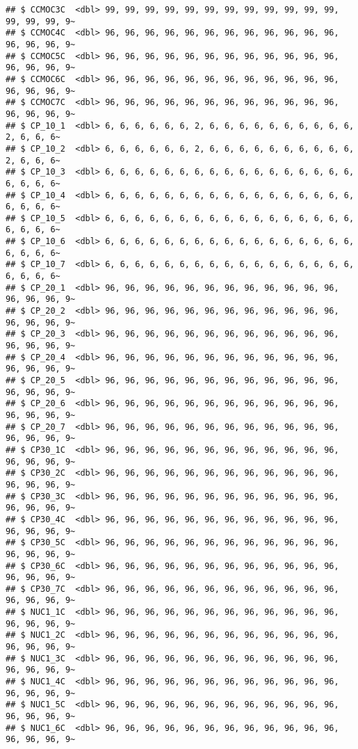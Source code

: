 \documentclass[
]{article}
\begin{document}
\begin{verbatim}
## $ CCMOC3C  <dbl> 99, 99, 99, 99, 99, 99, 99, 99, 99, 99, 99, 99, 99, 99, 99, 9~
## $ CCMOC4C  <dbl> 96, 96, 96, 96, 96, 96, 96, 96, 96, 96, 96, 96, 96, 96, 96, 9~
## $ CCMOC5C  <dbl> 96, 96, 96, 96, 96, 96, 96, 96, 96, 96, 96, 96, 96, 96, 96, 9~
## $ CCMOC6C  <dbl> 96, 96, 96, 96, 96, 96, 96, 96, 96, 96, 96, 96, 96, 96, 96, 9~
## $ CCMOC7C  <dbl> 96, 96, 96, 96, 96, 96, 96, 96, 96, 96, 96, 96, 96, 96, 96, 9~
## $ CP_10_1  <dbl> 6, 6, 6, 6, 6, 6, 2, 6, 6, 6, 6, 6, 6, 6, 6, 6, 6, 2, 6, 6, 6~
## $ CP_10_2  <dbl> 6, 6, 6, 6, 6, 6, 2, 6, 6, 6, 6, 6, 6, 6, 6, 6, 6, 2, 6, 6, 6~
## $ CP_10_3  <dbl> 6, 6, 6, 6, 6, 6, 6, 6, 6, 6, 6, 6, 6, 6, 6, 6, 6, 6, 6, 6, 6~
## $ CP_10_4  <dbl> 6, 6, 6, 6, 6, 6, 6, 6, 6, 6, 6, 6, 6, 6, 6, 6, 6, 6, 6, 6, 6~
## $ CP_10_5  <dbl> 6, 6, 6, 6, 6, 6, 6, 6, 6, 6, 6, 6, 6, 6, 6, 6, 6, 6, 6, 6, 6~
## $ CP_10_6  <dbl> 6, 6, 6, 6, 6, 6, 6, 6, 6, 6, 6, 6, 6, 6, 6, 6, 6, 6, 6, 6, 6~
## $ CP_10_7  <dbl> 6, 6, 6, 6, 6, 6, 6, 6, 6, 6, 6, 6, 6, 6, 6, 6, 6, 6, 6, 6, 6~
## $ CP_20_1  <dbl> 96, 96, 96, 96, 96, 96, 96, 96, 96, 96, 96, 96, 96, 96, 96, 9~
## $ CP_20_2  <dbl> 96, 96, 96, 96, 96, 96, 96, 96, 96, 96, 96, 96, 96, 96, 96, 9~
## $ CP_20_3  <dbl> 96, 96, 96, 96, 96, 96, 96, 96, 96, 96, 96, 96, 96, 96, 96, 9~
## $ CP_20_4  <dbl> 96, 96, 96, 96, 96, 96, 96, 96, 96, 96, 96, 96, 96, 96, 96, 9~
## $ CP_20_5  <dbl> 96, 96, 96, 96, 96, 96, 96, 96, 96, 96, 96, 96, 96, 96, 96, 9~
## $ CP_20_6  <dbl> 96, 96, 96, 96, 96, 96, 96, 96, 96, 96, 96, 96, 96, 96, 96, 9~
## $ CP_20_7  <dbl> 96, 96, 96, 96, 96, 96, 96, 96, 96, 96, 96, 96, 96, 96, 96, 9~
## $ CP30_1C  <dbl> 96, 96, 96, 96, 96, 96, 96, 96, 96, 96, 96, 96, 96, 96, 96, 9~
## $ CP30_2C  <dbl> 96, 96, 96, 96, 96, 96, 96, 96, 96, 96, 96, 96, 96, 96, 96, 9~
## $ CP30_3C  <dbl> 96, 96, 96, 96, 96, 96, 96, 96, 96, 96, 96, 96, 96, 96, 96, 9~
## $ CP30_4C  <dbl> 96, 96, 96, 96, 96, 96, 96, 96, 96, 96, 96, 96, 96, 96, 96, 9~
## $ CP30_5C  <dbl> 96, 96, 96, 96, 96, 96, 96, 96, 96, 96, 96, 96, 96, 96, 96, 9~
## $ CP30_6C  <dbl> 96, 96, 96, 96, 96, 96, 96, 96, 96, 96, 96, 96, 96, 96, 96, 9~
## $ CP30_7C  <dbl> 96, 96, 96, 96, 96, 96, 96, 96, 96, 96, 96, 96, 96, 96, 96, 9~
## $ NUC1_1C  <dbl> 96, 96, 96, 96, 96, 96, 96, 96, 96, 96, 96, 96, 96, 96, 96, 9~
## $ NUC1_2C  <dbl> 96, 96, 96, 96, 96, 96, 96, 96, 96, 96, 96, 96, 96, 96, 96, 9~
## $ NUC1_3C  <dbl> 96, 96, 96, 96, 96, 96, 96, 96, 96, 96, 96, 96, 96, 96, 96, 9~
## $ NUC1_4C  <dbl> 96, 96, 96, 96, 96, 96, 96, 96, 96, 96, 96, 96, 96, 96, 96, 9~
## $ NUC1_5C  <dbl> 96, 96, 96, 96, 96, 96, 96, 96, 96, 96, 96, 96, 96, 96, 96, 9~
## $ NUC1_6C  <dbl> 96, 96, 96, 96, 96, 96, 96, 96, 96, 96, 96, 96, 96, 96, 96, 9~

\end{verbatim}
\end{document}
